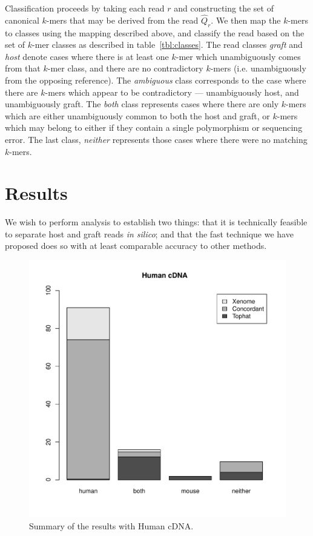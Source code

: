 \documentclass[twocolumn]{article}
\begin{document}
Classification proceeds by taking each read $r$ and constructing the set
of canonical $k$-mers that may be derived from the read $\hat{Q}_r$. We
then map the $k$-mers to classes using the mapping described above,
and classify the read based on the set of $k$-mer classes as described
in table~\ref{tbl:classes}.  The read classes \textit{graft} and
\textit{host} denote cases where there is at least one $k$-mer which
unambiguously comes from that $k$-mer class, and there are no contradictory
$k$-mers (i.e. unambiguously from the opposing reference).
The \textit{ambiguous} class corresponds to the case where there
are $k$-mers which appear to be contradictory --- unambiguously host,
and unambiguously graft. The \textit{both} class represents cases where
there are only $k$-mers which are either unambiguously common to both the
host and graft, or $k$-mers which may belong to either if they contain a
single polymorphism or sequencing error. The last class, \textit{neither}
represents those cases where there were no matching $k$-mers.


\section{Results}

We wish to perform analysis to establish two things: that it is technically
feasible to separate host and graft reads \textit{in silico}; and that the
fast technique we have proposed does so with at least comparable accuracy
to other methods.

\begin{figure}
\includegraphics[scale=0.4]{human.pdf}
\caption{Summary of the results with Human cDNA.}
\label{fig:human}
\end{figure}
\end{document}
